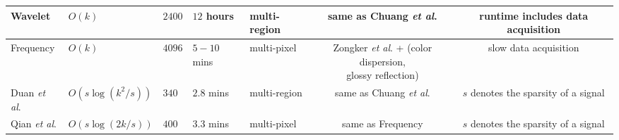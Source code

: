 {\begin{tabular}{lllllcc}
Wavelet \cite{wang2004image}                         & $O(k)$ & $ 2400$            & $12$ hours & multi-region&  same as Chuang \textit{et al}. \cite{chuang2000environment} & runtime includes data acquisition \\
        \midrule                                                                    
Frequency \cite{zhu2004frequency}                    & $O(k)$ & $ 4096$            & $5-10$ mins & multi-pixel & \makecell{Zongker \textit{et al}. \cite{zongker1999environment} + (color dispersion, \\ glossy reflection)} & slow data acquisition   \\
        \midrule                                                                    
Duan \textit{et al}. \cite{duan2011fast}             & $O(s\log (k^2/s))$ & $ 340$ & $2.8$ mins & multi-region&  same as Chuang \textit{et al}. \cite{chuang2000environment} & $s$ denotes the sparsity of a signal \\ %
        \midrule                                                                    
Qian \textit{et al}. \cite{qian2015frequency}        & $O(s\log (2k/s))$ & $ 400$  & $3.3$ mins & multi-pixel & same as Frequency \cite{zhu2004frequency} & $s$ denotes the sparsity of a signal\\
        \bottomrule
    \end{tabular}
    }

